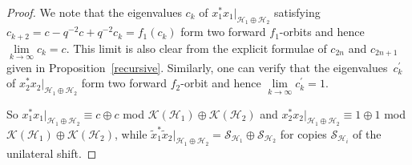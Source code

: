 \begin{proof} We note that the eigenvalues $c_{k}$ of $x_{1}^{\ast}x_{1}%
|_{\mathcal{H}_{1}\oplus\mathcal{H}_{2}}$ satisfying $c_{k+2}=c-q^{-2}%
c+q^{-2}c_{k}=f_{1}( c_{k}) $ form two forward $f_{1}$-orbits and
hence $\lim\limits_{k\rightarrow\infty}c_{k}=c$. This limit is also clear from the
explicit formulae of $c_{2n}$ and $c_{2n+1}$ given in Proposition~\ref{recursive}.
Similarly, one can verify that the eigenvalues~$c_{k}^{\prime}$ of
$x_{2}^{\ast}x_{2}|_{\mathcal{H}_{1}\oplus\mathcal{H}_{2}}$ form two forward
$f_{2}$-orbit and hence $\lim\limits_{k\rightarrow\infty}c_{k}^{\prime}=1$.

So $x_{1}^{\ast}x_{1}|_{\mathcal{H}_{1}\oplus\mathcal{H}_{2}}\equiv c\oplus c$
mod $\mathcal{K}( \mathcal{H}_{1}) \oplus\mathcal{K}(
\mathcal{H}_{2}) $ and $x_{2}^{\ast}x_{2}|_{\mathcal{H}_{1}%
\oplus\mathcal{H}_{2}}\equiv1\oplus1$ mod $\mathcal{K}( \mathcal{H}%
_{1}) \oplus\mathcal{K}( \mathcal{H}_{2}) $, while
$\tilde{x}_{1}^{\ast}\tilde{x}_{2}|_{\mathcal{H}_{1}\oplus\mathcal{H}_{2}%
}=\mathcal{S}_{\mathcal{H}_{1}}\oplus\mathcal{S}_{\mathcal{H}_{2}}$ for copies
$\mathcal{S}_{\mathcal{H}_{i}}$ of the unilateral shift.


\end{proof}
